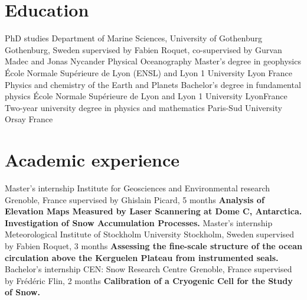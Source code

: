 \documentclass[11pt,a4paper,roman]{moderncv}
\begin{document}
\makecvtitle


\section{Education}
        {PhD studies}
        {Department of Marine Sciences, University of Gothenburg}
        {Gothenburg, Sweden}
        {supervised by Fabien Roquet, co-supervised by Gurvan Madec and Jonas Nycander}
        {Physical Oceanography}
        {Master's degree in geophysics}
        {École Normale Supérieure de Lyon (ENSL) and Lyon 1 University}
        {Lyon}
        {France}
        {Physics and chemistry of the Earth and Planets}
        {Bachelor's degree in fundamental physics}
        {École Normale Supérieure de Lyon and Lyon 1 University}
        {Lyon}{France}{}
        {Two-year university degree in physics and mathematics}
        {Paris-Sud University}
        {Orsay}
        {France}
        {}


\section{Academic experience}
        {Master's internship}
        {Institute for Geosciences and Environmental research}
        {Grenoble, France}
        {supervised by Ghislain Picard, 5 months}
        {\textbf{Analysis of Elevation Maps Measured by Laser Scannering at
            Dome C, Antarctica. Investigation of Snow Accumulation Processes.}}
        {Master's internship}
        {Meteorological Institute of Stockholm University}
        {Stockholm, Sweden}
        {supervised by Fabien Roquet, 3 months}
        {\textbf{Assessing the fine-scale structure of the ocean
            circulation above the Kerguelen Plateau from instrumented seals.}}
        {Bachelor's internship}
        {CEN: Snow Research Centre}
        {Grenoble, France}
        {supervised by Frédéric Flin, 2 months}
        {\textbf{Calibration of a Cryogenic Cell for the Study of Snow.}}

        
\end{document}
